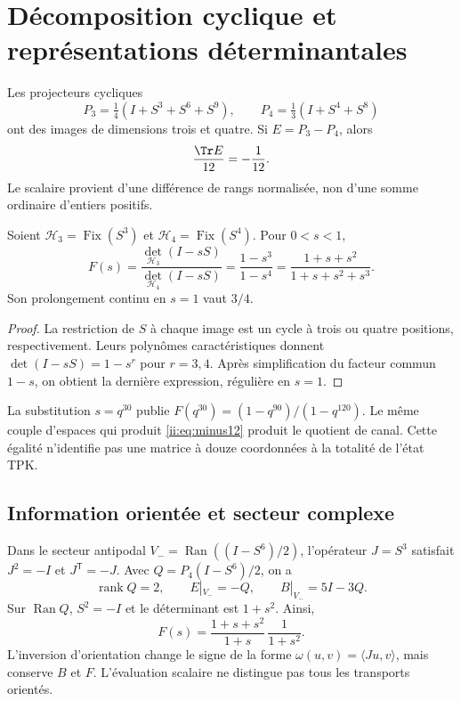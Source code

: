 \section{Décomposition cyclique et représentations déterminantales}
Les projecteurs cycliques
\[
P_3=\tfrac14(I+S^3+S^6+S^9),\qquad
P_4=\tfrac13(I+S^4+S^8)
\]
ont des images de dimensions trois et quatre. Si $E=P_3-P_4$, alors
\begin{equation}
\frac{\Tr E}{12}=-\frac1{12}.
\label{ii:eq:minus12}
\end{equation}
Le scalaire provient d'une différence de rangs normalisée, non d'une
somme ordinaire d'entiers positifs.

\begin{theorem}
Soient $\mathcal H_3=\operatorname{Fix}(S^3)$ et
$\mathcal H_4=\operatorname{Fix}(S^4)$. Pour $0<s<1$,
\begin{equation}
F(s)=\frac{\det_{\mathcal H_3}(I-sS)}{\det_{\mathcal H_4}(I-sS)}
=\frac{1-s^3}{1-s^4}
=\frac{1+s+s^2}{1+s+s^2+s^3}.
\label{ii:eq:det}
\end{equation}
Son prolongement continu en $s=1$ vaut $3/4$.
\end{theorem}
\begin{proof}
La restriction de $S$ à chaque image est un cycle à trois ou quatre
positions, respectivement. Leurs polynômes caractéristiques donnent
$\det(I-sS)=1-s^r$ pour $r=3,4$. Après simplification du facteur commun $1-s$,
on obtient la dernière expression, régulière en $s=1$.
\end{proof}

La substitution $s=q^{30}$ publie
$F(q^{30})=(1-q^{90})/(1-q^{120})$.
Le même couple d'espaces qui produit \eqref{ii:eq:minus12}
produit le quotient de canal. Cette égalité n'identifie pas
une matrice à douze coordonnées à la totalité de l'état TPK.

\subsection{Information orientée et secteur complexe}
Dans le secteur antipodal $V_-=\operatorname{Ran}((I-S^6)/2)$,
l'opérateur $J=S^3$ satisfait $J^2=-I$ et $J^{\mathsf T}=-J$.
Avec $Q=P_4(I-S^6)/2$, on a
\[
\operatorname{rank}Q=2,\qquad E|_{V_-}=-Q,\qquad B|_{V_-}=5I-3Q.
\]
Sur $\operatorname{Ran}Q$, $S^2=-I$ et le déterminant est $1+s^2$.
Ainsi,
\[
F(s)=\frac{1+s+s^2}{1+s}\,\frac1{1+s^2}.
\]
L'inversion d'orientation change le signe de la forme
$\omega(u,v)=\langle Ju,v\rangle$, mais conserve $B$ et $F$.
L'évaluation scalaire ne distingue pas tous les transports orientés.

